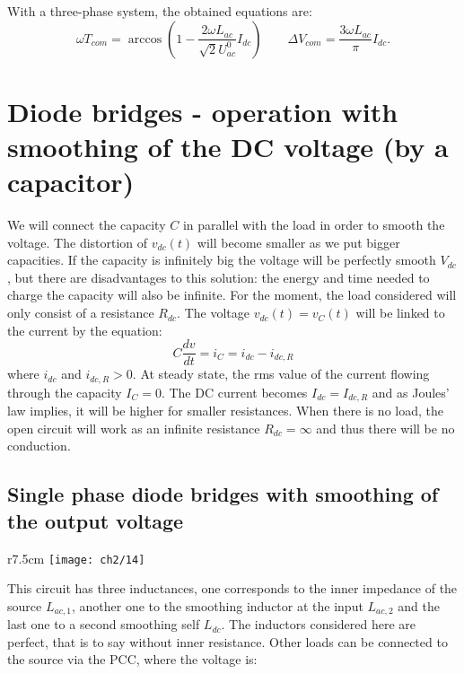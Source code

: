 		With a three-phase system, the obtained equations are: 
		\begin{equation}
			\omega T_{com} = \arccos \left( 1-\frac{2\omega L_{ac}}{\sqrt{2}U_{ac}^0} I_{dc}\right) \qquad \Delta V_{com} = \frac{3\omega L_{ac}}{\pi} I_{dc}.
		\end{equation}
		
\section{Diode bridges - operation with smoothing of the DC voltage (by a capacitor)}
    We will connect the capacity $C$ in parallel with the load in order to smooth the voltage. The distortion of $v_{dc}(t)$ will become smaller as we put bigger capacities. If the capacity is infinitely big the voltage will be perfectly smooth $V_{dc}$, but there are disadvantages to this solution: the energy and time needed to charge the capacity will also be infinite. For the moment, the load considered will only consist of a resistance $R_{dc}$. The voltage $v_{dc}(t) = v_C(t)$ will be linked to the current by the equation:
	\begin{equation}
		C\frac{dv}{dt} = i_C = i_{dc} - i_{dc,R}
	\end{equation}
	where $i_{dc}$ and $i_{dc,R} > 0$. At steady state, the rms value of the current flowing through the capacity $I_C = 0$. The DC current becomes $I_{dc} = I_{dc,R}$ and as Joules' law implies, it will be higher for smaller resistances. When there is no load, the open circuit will work as an infinite resistance $R_{dc}=\infty$ and thus there will be no conduction.
	
	\subsection{Single phase diode bridges with smoothing of the output voltage}
		\begin{wrapfigure}[7]{r}{7.5cm}
		\vspace{-5mm}
		\texttt{[image: ch2/14]}
		\end{wrapfigure} 
		This circuit has three inductances, one corresponds to the inner impedance of the source $L_{ac,1}$, another one to the smoothing inductor at the input $L_{ac,2}$ and the last one to a second smoothing self $L_{dc}$. The inductors considered here are perfect, that is to say without inner resistance. Other loads can be connected to the source via the PCC, where the voltage is:
		
